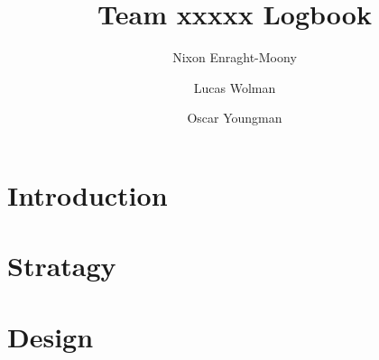 \documentclass{book}
\title{Team xxxxx Logbook}
\author{Nixon Enraght-Moony 
        \and
        Lucas Wolman
        \and
        Oscar Youngman
}
\begin{document}
\maketitle
\tableofcontents

\part{Introduction}


\part{Stratagy}


\part{Design}

\end{document}
